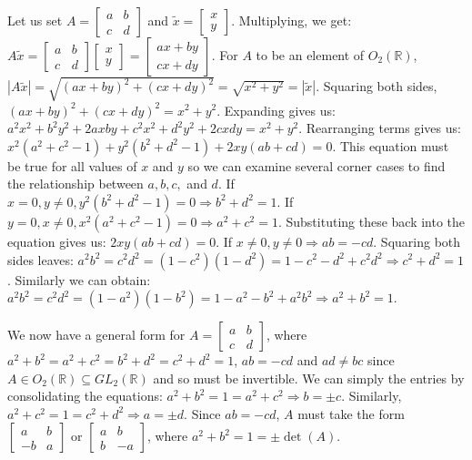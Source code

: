 \documentclass[12pt,letterpaper,reqno]{amsart}
\newcommand{\R}{\mathbb R}
\begin{document}
\begin{enumerate}
\begin{flushleft}
Let us set $A = \begin{bmatrix} a & b \\c & d \end{bmatrix}$ and $\tilde{x} = \begin{bmatrix} x \\y \end{bmatrix}$. Multiplying, we get: $A\tilde{x} = \begin{bmatrix} a & b \\c & d \end{bmatrix} \begin{bmatrix} x \\y \end{bmatrix} = \begin{bmatrix} ax + by \\cx + dy \end{bmatrix}$.\newline
For $A$ to be an element of $O_2(\R)$, $|A\tilde{x}| = \sqrt{(ax+by)^2+(cx+dy)^2} = \sqrt{x^2 + y^2} = |\tilde{x}|$.\newline
Squaring both sides, $(ax+by)^2+(cx+dy)^2 = x^2 + y^2$. Expanding gives us: $a^2x^2 + b^2y^2 + 2axby + c^2x^2 + d^2y^2 + 2cxdy = x^2 + y^2$. Rearranging terms gives us: $x^2(a^2 + c^2 - 1) + y^2(b^2 + d^2 - 1) + 2xy(ab + cd) = 0$. This equation must be true for all values of $x$ and $y$ so we can examine several corner cases to find the relationship between $a, b, c,$ and $d$. If $x = 0, y \not= 0, y^2(b^2 + d^2 -1) = 0 \Rightarrow  b^2 + d^2 = 1$. If $y = 0, x \not= 0, x^2(a^2 + c^2 - 1) = 0 \Rightarrow a^2 + c^2 = 1$. Substituting these back into the equation gives us: $2xy(ab + cd) = 0$. If $x \not= 0, y \not= 0 \Rightarrow ab = -cd$. Squaring both sides leaves: $a^2b^2 = c^2d^2 = (1 - c^2)(1 - d^2) = 1 - c^2 - d^2 + c^2d^2 \Rightarrow c^2 + d^2 = 1$. Similarly we can obtain: $a^2b^2 = c^2d^2 = (1 - a^2)(1 - b^2) = 1 - a^2 - b^2 + a^2b^2 \Rightarrow a^2 + b^2 = 1$.
\newline

We now have a general form for $A = \begin{bmatrix} a & b \\c & d \end{bmatrix}$, where $a^2 + b^2 = a^2 + c^2 = b^2 + d^2 = c^2 + d^2 = 1$, $ab = -cd$ and $ad \not= bc$ since $A \in O_2(\R) \subseteq GL_2(\R)$ and so must be invertible. We can simply the entries by consolidating the equations: $a^2 + b^2 = 1 = a^2 + c^2 \Rightarrow b = \pm c$. Similarly, $a^2 + c^2 = 1 = c^2 + d^2 \Rightarrow a = \pm d$. Since $ab = -cd$, $A$ must take the form $\begin{bmatrix} a & b \\-b & a \end{bmatrix}$ or $\begin{bmatrix} a & b \\b & -a \end{bmatrix}$, where $a^2 + b^2 = 1 = \pm \det(A)$.
\newline


\end{flushleft}
\end{enumerate}
\end{document}
